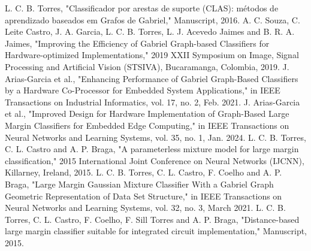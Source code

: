 \documentclass[conference]{IEEEtran}
\begin{document}
\begin{thebibliography}{00}
     L. C. B. Torres, "Classificador por arestas de suporte (CLAS): métodos de aprendizado baseados em Grafos de Gabriel," Manuscript, 2016.
     A. C. Souza, C. Leite Castro, J. A. Garcia, L. C. B. Torres, L. J. Acevedo Jaimes and B. R. A. Jaimes, "Improving the Efficiency of Gabriel Graph-based Classifiers for Hardware-optimized Implementations," 2019 XXII Symposium on Image, Signal Processing and Artificial Vision (STSIVA), Bucaramanga, Colombia, 2019.
     J. Arias-Garcia et al., "Enhancing Performance of Gabriel Graph-Based Classifiers by a Hardware Co-Processor for Embedded System Applications," in IEEE Transactions on Industrial Informatics, vol. 17, no. 2, Feb. 2021.
     J. Arias-Garcia et al., "Improved Design for Hardware Implementation of Graph-Based Large Margin Classifiers for Embedded Edge Computing," in IEEE Transactions on Neural Networks and Learning Systems, vol. 35, no. 1, Jan. 2024.
     L. C. B. Torres, C. L. Castro and A. P. Braga, "A parameterless mixture model for large margin classification," 2015 International Joint Conference on Neural Networks (IJCNN), Killarney, Ireland, 2015.
     L. C. B. Torres, C. L. Castro, F. Coelho and A. P. Braga, "Large Margin Gaussian Mixture Classifier With a Gabriel Graph Geometric Representation of Data Set Structure," in IEEE Transactions on Neural Networks and Learning Systems, vol. 32, no. 3, March 2021.
     L. C. B. Torres, C. L. Castro, F. Coelho, F. Sill Torres and A. P. Braga, "Distance-based large margin classifier suitable for integrated circuit implementation," Manuscript, 2015.
\end{thebibliography}
\end{document}
